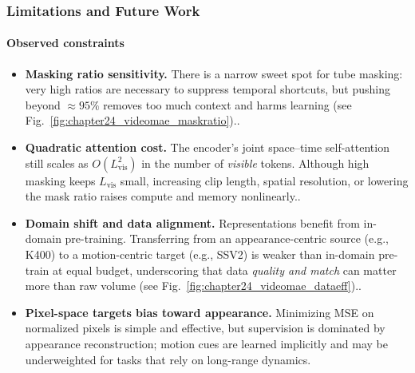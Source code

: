 \begin{enrichment}
\begin{enrichment}
    \newpage
    
    \subsubsection{Limitations and Future Work}
    \label{subsubsec_chapter24_videomae_limits}
    
    \paragraph{Observed constraints}
    \begin{itemize}
        \item \textbf{Masking ratio sensitivity.} There is a narrow sweet spot for tube masking: very high ratios are necessary to suppress temporal shortcuts, but pushing beyond $\approx 95\%$ removes too much context and harms learning (see Fig.~\ref{fig:chapter24_videomae_maskratio})..
        \item \textbf{Quadratic attention cost.} The encoder’s joint space--time self-attention still scales as $O(L_{\text{vis}}^2)$ in the number of \emph{visible} tokens. Although high masking keeps $L_{\text{vis}}$ small, increasing clip length, spatial resolution, or lowering the mask ratio raises compute and memory nonlinearly..
        \item \textbf{Domain shift and data alignment.} Representations benefit from in-domain pre-training. Transferring from an appearance-centric source (e.g., K400) to a motion-centric target (e.g., SSV2) is weaker than in-domain pre-train at equal budget, underscoring that data \emph{quality and match} can matter more than raw volume (see Fig.~\ref{fig:chapter24_videomae_dataeff})..
        \item \textbf{Pixel-space targets bias toward appearance.} Minimizing MSE on normalized pixels is simple and effective, but supervision is dominated by appearance reconstruction; motion cues are learned implicitly and may be underweighted for tasks that rely on long-range dynamics.
    \end{itemize}
    

\end{enrichment}
\end{enrichment}
